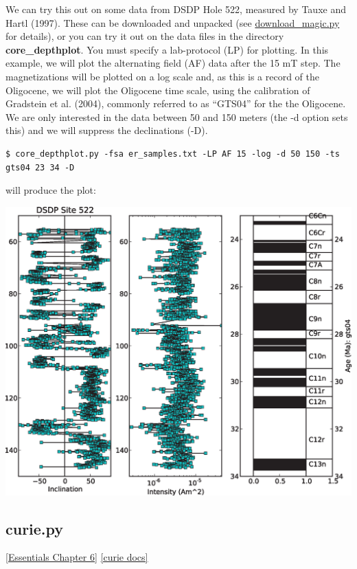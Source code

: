 \documentclass[11pt]{book}
\begin{document}
{{We can try this out on some data from DSDP Hole 522, measured by Tauxe and Hartl (1997).  \nocite{tauxe97}  These can be downloaded and unpacked (see \href{#download_magic.py}{download\_magic.py} for details),  or you can try it out on the data files in the directory {\bf core\_depthplot}.   You must specify a lab-protocol (LP) for plotting.  In this example, we will plot the alternating field (AF) data after the 15 mT step.  The magnetizations will be plotted on a log scale and, as this is a record of the Oligocene, we will plot the Oligocene time scale, using the calibration of Gradstein et al. (2004),  \nocite{gradstein04} commonly referred to as ``GTS04'' for the the Oligocene.  We are only interested in the data between 50 and 150 meters (the -d option sets this) and we will suppress the declinations (-D).

\begin{verbatim}
$ core_depthplot.py -fsa er_samples.txt -LP AF 15 -log -d 50 150 -ts gts04 23 34 -D
\end{verbatim}

\noindent  will produce the plot:

\includegraphics[width=15cm]{EPSfiles/core-depthplot.eps}


\subsection{curie.py}
\href{http://earthref.org/MAGIC/books/Tauxe/Essentials/WebBook3ch6.html#ch6}{[Essentials Chapter 6]}
\href{https://github.com/PmagPy/PmagPy/blob/master/programs/curie.py}{[curie docs]}

}}
\end{document}
